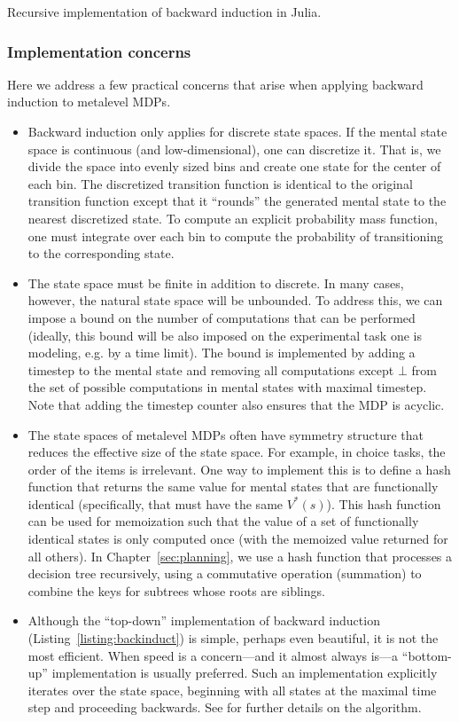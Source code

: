 \begin{listing}[tb!]
\caption{Recursive implementation of backward induction in Julia.}
\label{listing:backinduct}
\end{listing}

\subsubsection{Implementation concerns}

Here we address a few practical concerns that arise when applying backward induction to metalevel MDPs.

\begin{itemize}
  \item Backward induction only applies for discrete state spaces. If the mental state space is continuous (and low-dimensional), one can discretize it. That is, we divide the space into evenly sized bins and create one state for the center of each bin. The discretized transition function is identical to the original transition function except that it ``rounds'' the generated mental state to the nearest discretized state. To compute an explicit probability mass function, one must integrate over each bin to compute the probability of transitioning to the corresponding state.
  \item The state space must be finite in addition to discrete. In many cases, however, the natural state space will be unbounded. To address this, we can impose a bound on the number of computations that can be performed (ideally, this bound will be also imposed on the experimental task one is modeling, e.g. by a time limit). The bound is implemented by adding a timestep to the mental state and removing all computations except $\bot$ from the set of possible computations in mental states with maximal timestep. Note that adding the timestep counter also ensures that the MDP is acyclic.
  \item The state spaces of metalevel MDPs often have symmetry structure that reduces the effective size of the state space. For example, in choice tasks, the order of the items is irrelevant. One way to implement this is to define a hash function that returns the same value for mental states that are functionally identical (specifically, that must have the same $V^*(s)$). This hash function can be used for memoization such that the value of a set of functionally identical states is only computed once (with the memoized value returned for all others). In Chapter~\ref{sec:planning}, we use a hash function that processes a decision tree recursively, using a commutative operation (summation) to combine the keys for subtrees whose roots are siblings.
  \item Although the ``top-down'' implementation of backward induction (Listing~\ref{listing:backinduct}) is simple, perhaps even beautiful, it is not the most efficient. When speed is a concern---and it almost always is---a ``bottom-up'' implementation is usually preferred. Such an implementation explicitly iterates over the state space, beginning with all states at the maximal time step and proceeding backwards. See \citet{puterman2014markov} for further details on the algorithm.
\end{itemize}


